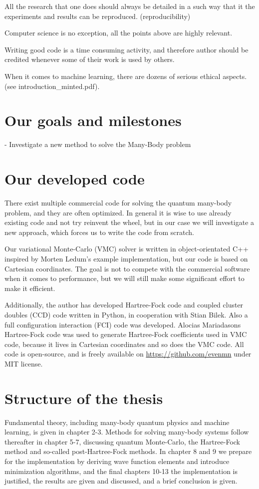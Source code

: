 All the research that one does should always be detailed in a such way that it the experiments and results can be reproduced. (reproducibility) 

Computer science is no exception, all the points above are highly relevant.  

Writing good code is a time consuming activity, and therefore author should be credited whenever some of their work is used by others. 

When it comes to machine learning, there are dozens of serious ethical aspects. (see introduction\_minted.pdf).

\section{Our goals and milestones} \label{subsec:goals}
- Investigate a new method to solve the Many-Body problem

\section{Our developed code}
There exist multiple commercial code for solving the quantum many-body problem, and they are often optimized. In general it is wise to use already existing code and not try reinvent the wheel, but in our case we will investigate a new approach, which forces us to write the code from scratch.

Our variational Monte-Carlo (VMC) solver is written in object-orientated C++ inspired by Morten Ledum's example implementation, but our code is based on Cartesian coordinates. The goal is not to compete with the commercial software when it comes to performance, but we will still make some significant effort to make it efficient. 

Additionally, the author has developed Hartree-Fock code and coupled cluster doubles (CCD) code written in Python, in cooperation with Stian Bilek. Also a full configuration interaction (FCI) code was developed. Alocias Mariadasons Hartree-Fock code was used to generate Hartree-Fock coefficients used in VMC code, because it lives in Cartesian coordinates and so does the VMC code. All code is open-source, and is freely available on \url{https://github.com/evenmn} under MIT license. 

\section{Structure of the thesis}
Fundamental theory, including many-body quantum physics and machine learning, is given in chapter 2-3. Methods for solving many-body systems follow thereafter in chapter 5-7, discussing quantum Monte-Carlo, the Hartree-Fock method and so-called post-Hartree-Fock methods. In chapter 8 and 9 we prepare for the implementation by deriving wave function elements and introduce minimization algorithms, and the final chapters 10-13 the implementation is justified, the results are given and discussed, and a brief conclusion is given.
